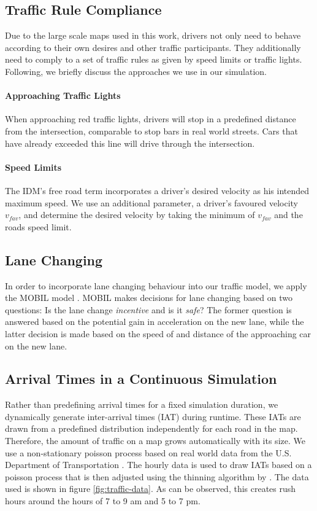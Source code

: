 \documentclass[11pt]{article}
\begin{document}
\subsection{Traffic Rule Compliance}
Due to the large scale maps used in this work, drivers not only need to behave according to their own desires and other traffic participants. They additionally need to comply to a set of traffic rules as given by speed limits or traffic lights. Following, we briefly discuss the approaches we use in our simulation.

\paragraph{Approaching Traffic Lights} When approaching red traffic lights, drivers will stop in a predefined distance from the intersection, comparable to stop bars in real world streets. Cars that have already exceeded this line will drive through the intersection. 

\paragraph{Speed Limits} The IDM's free road term incorporates a driver's desired velocity as his intended maximum speed. We use an additional parameter, a driver's favoured velocity $v_{fav}$, and determine the desired velocity by taking the minimum of $v_{fav}$ and the roads speed limit.

\subsection{Lane Changing}
In order to incorporate lane changing behaviour into our traffic model, we apply the MOBIL model \citep{treiber2002realistische, kesting2007general}. MOBIL makes decisions for lane changing based on two questions: Is the lane change \textit{incentive} and is it \textit{safe}? The former question is answered based on the potential gain in acceleration on the new lane, while the latter decision is made based on the speed of and distance of the approaching car on the new lane.

\subsection{Arrival Times in a Continuous Simulation}
Rather than predefining arrival times for a fixed simulation duration, we dynamically generate inter-arrival times (IAT) during runtime. These IATs are drawn from a predefined distribution independently for each road in the map. Therefore, the amount of traffic on a map grows automatically with its size. We use a non-stationary poisson process based on real world data from the U.S. Department of Transportation \citep{trafficdata}. The hourly data is used to draw IATs based on a poisson process that is then adjusted using the thinning algorithm by \citet{lewis1979simulation}. The data used is shown in figure \ref{fig:traffic-data}. As can be observed, this creates rush hours around the hours of 7 to 9 am and 5 to 7 pm.
\end{document}
